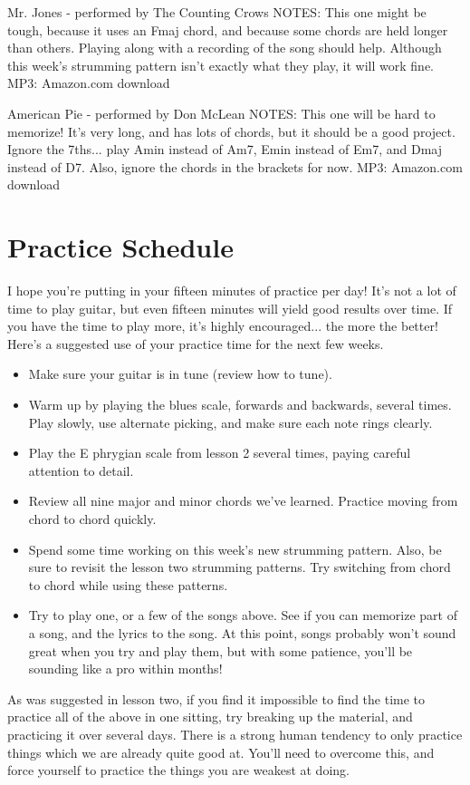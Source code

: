 Mr. Jones - performed by The Counting Crows
NOTES: This one might be tough, because it uses an Fmaj chord, and because some chords are held longer than others. Playing along with a recording of the song should help. Although this week's strumming pattern isn't exactly what they play, it will work fine.
MP3: Amazon.com download

American Pie - performed by Don McLean
NOTES: This one will be hard to memorize! It's very long, and has lots of chords, but it should be a good project. Ignore the 7ths... play Amin instead of Am7, Emin instead of Em7, and Dmaj instead of D7. Also, ignore the chords in the brackets for now.
MP3: Amazon.com download

\section{Practice Schedule}
I hope you're putting in your fifteen minutes of practice per day! It's not a lot of time to play guitar, but even fifteen minutes will yield good results over time. If you have the time to play more, it's highly encouraged... the more the better! Here's a suggested use of your practice time for the next few weeks.
\begin{itemize}
\item Make sure your guitar is in tune (review how to tune).
\item Warm up by playing the blues scale, forwards and backwards, several times. Play slowly, use alternate picking, and make sure each note rings clearly.
\item Play the E phrygian scale from lesson 2 several times, paying careful attention to detail.
\item Review all nine major and minor chords we've learned. Practice moving from chord to chord quickly.
\item Spend some time working on this week's new strumming pattern. Also, be sure to revisit the lesson two strumming patterns. Try switching from chord to chord while using these patterns.
\item Try to play one, or a few of the songs above. See if you can memorize part of a song, and the lyrics to the song. At this point, songs probably won't sound great when you try and play them, but with some patience, you'll be sounding like a pro within months! 
\end{itemize}
As was suggested in lesson two, if you find it impossible to find the time to practice all of the above in one sitting, try breaking up the material, and practicing it over several days. There is a strong human tendency to only practice things which we are already quite good at. You'll need to overcome this, and force yourself to practice the things you are weakest at doing.

